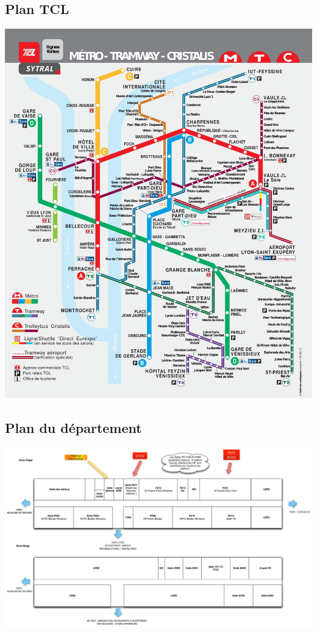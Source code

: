 \subsection{Plan TCL}
\hspace{-2cm}
\includegraphics[width=19cm]{images/planTCLFullRes.jpg}

\newpage 
\subsection{Plan du département}
\begin{center}
\includegraphics[width=24cm, angle=90]{images/planDepart.jpg}
\end{center}

